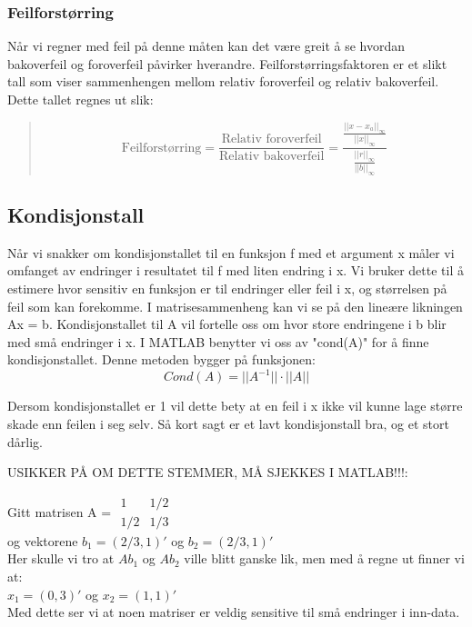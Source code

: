 \subsubsection{Feilforstørring}
Når vi regner med feil på denne måten kan det være greit å se hvordan bakoverfeil og foroverfeil påvirker hverandre. Feilforstørringsfaktoren er et slikt tall som viser sammenhengen mellom relativ foroverfeil og relativ bakoverfeil. Dette tallet regnes ut slik:
\begin{quote}
\begin{equation*}
\mbox{Feilforstørring} = \frac{\mbox{Relativ foroverfeil}}{\mbox{Relativ bakoverfeil}} = \frac{\frac{||x - x_a||_{\infty}}{||x||_{\infty}}}{\frac{||r||_{\infty}}{||b||_{\infty}}}
\end{equation*}
\end{quote}
 

 
 \subsection{Kondisjonstall}
Når vi snakker om kondisjonstallet til en funksjon f med et argument x måler vi omfanget av endringer i resultatet til f med liten endring i x. Vi bruker dette til å estimere hvor sensitiv en funksjon er til endringer eller feil i x, og størrelsen på feil som kan forekomme. I matrisesammenheng kan vi se på den lineære likningen Ax = b. Kondisjonstallet til A vil fortelle oss om hvor store endringene i b blir med små endringer i x. I MATLAB benytter vi oss av "cond(A)" for å finne kondisjonstallet. Denne metoden bygger på funksjonen:
 \
 \begin{equation}
 Cond(A) = ||A^{-1}|| \cdot ||A||
 \end{equation}
 
Dersom kondisjonstallet er 1 vil dette bety at en feil i x ikke vil kunne lage større skade enn feilen i seg selv. Så kort sagt er et lavt kondisjonstall bra, og et stort dårlig. 

USIKKER PÅ OM DETTE STEMMER, MÅ SJEKKES I MATLAB!!!:

Gitt matrisen A = $\begin{matrix}
 
	1 & 1/2\\
	1/2 & 1/3
	
\end{matrix}$
\\
og vektorene $b_1 = (2/3, 1)'$ og $b_2 = (2/3, 1)'$
\\Her skulle vi tro at $Ab_1$ og $Ab_2$ ville blitt ganske lik, men med å regne ut finner vi at:\\$x_1 = (0, 3)'$ og $x_2 = (1, 1)'$
\\Med dette ser vi at noen matriser er veldig sensitive til små endringer i inn-data.

